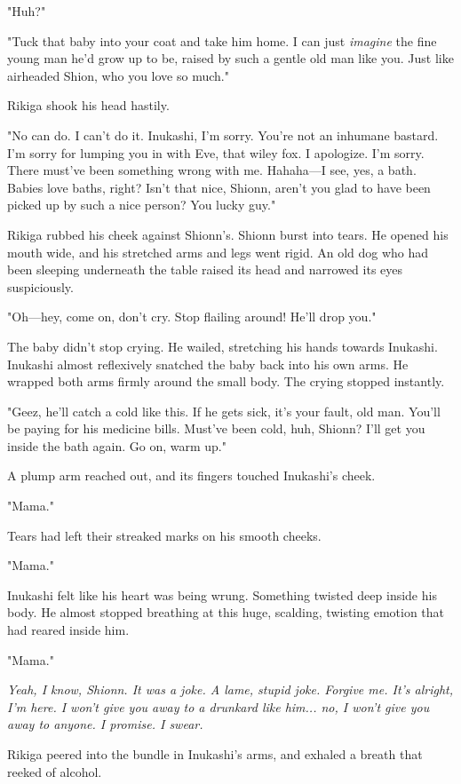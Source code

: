 "Huh?"

"Tuck that baby into your coat and take him home. I can just \emph{imagine} the
fine young man he'd grow up to be, raised by such a gentle old man like
you. Just like airheaded Shion, who you love so much."

Rikiga shook his head hastily.

"No can do. I can't do it. Inukashi, I'm sorry. You're not an inhumane
bastard. I'm sorry for lumping you in with Eve, that wiley fox. I
apologize. I'm sorry. There must've been something wrong with me.
Hahaha---I see, yes, a bath. Babies love baths, right? Isn't that nice,
Shionn, aren't you glad to have been picked up by such a nice person?
You lucky guy."

Rikiga rubbed his cheek against Shionn's. Shionn burst into tears. He
opened his mouth wide, and his stretched arms and legs went rigid. An
old dog who had been sleeping underneath the table raised its head and
narrowed its eyes suspiciously.

"Oh---hey, come on, don't cry. Stop flailing around! He'll drop you."

The baby didn't stop crying. He wailed, stretching his hands towards
Inukashi. Inukashi almost reflexively snatched the baby back into his
own arms. He wrapped both arms firmly around the small body. The crying
stopped instantly.

"Geez, he'll catch a cold like this. If he gets sick, it's your fault,
old man. You'll be paying for his medicine bills. Must've been cold,
huh, Shionn? I'll get you inside the bath again. Go on, warm up."

A plump arm reached out, and its fingers touched Inukashi's cheek.

"Mama."

Tears had left their streaked marks on his smooth cheeks.

"Mama."

Inukashi felt like his heart was being wrung. Something twisted deep
inside his body. He almost stopped breathing at this huge, scalding,
twisting emotion that had reared inside him.

"Mama."

\emph{Yeah, I know, Shionn. It was a joke. A lame, stupid joke. Forgive me.
It's alright, I'm here. I won't give you away to a drunkard like him...
no, I won't give you away to anyone. I promise. I swear.}

\mybreak

Rikiga peered into the bundle in Inukashi's arms, and exhaled a breath
that reeked of alcohol.

